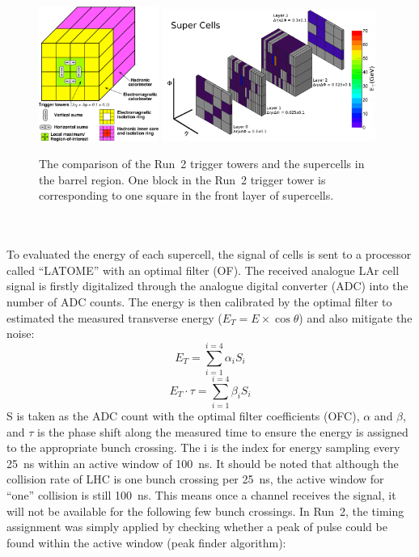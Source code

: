 \begin{figure}[!h]                
	\includegraphics[width=0.35\textwidth]{Chapter6/Run2TT.pdf}
	\includegraphics[width=0.62\textwidth]{Chapter6/Supercell.png}
	\begin{center}
		\caption{The comparison of the Run~2 trigger towers\cite{Aleksa:1602230} and the supercells\cite{Aaboud:2016leb} in the barrel region. One block in the Run~2 trigger tower is corresponding to one square in the front layer of supercells. }
		\label{Fig:tt_compar}            
	\end{center}
\end{figure}
\noindent
\\
\\To evaluated the energy of each supercell, the signal of cells is sent to a processor called ``LATOME'' with an optimal filter (OF). The received analogue LAr cell signal is firstly digitalized through the analogue digital converter (ADC) into the number of ADC counts. The energy is then calibrated by the optimal filter to estimated the measured transverse energy ($E_{T}=E\times\cos\theta$) and also mitigate the noise:
\begin{equation}
\label{Eq:get_Et}
E_{T}=\displaystyle\sum_{i=1}^{i=4}\alpha_{i}S_{i}
\end{equation}
\begin{equation}
\label{Eq:get_tau}
E_{T}\cdot\tau=\displaystyle\sum_{i=1}^{i=4}\beta_{i}S_{i}
\end{equation}
\noindent
S is taken as the ADC count with the optimal filter coefficients (OFC), $\alpha$ and $\beta$, and $\tau$ is the phase shift along the measured time to ensure the energy is assigned to the appropriate bunch crossing. The i is the index for energy sampling every 25~ns within an active window of 100~ns. It should be noted that although the collision rate of LHC is one bunch crossing per 25~ns, the active window for ``one'' collision is still 100~ns. This means once a channel receives the signal, it will not be available for the following few bunch crossings. In Run~2, the timing assignment was simply applied by checking whether a peak of pulse could be found within the active window\cite{Jongmanns:2661780} (peak finder algorithm):
